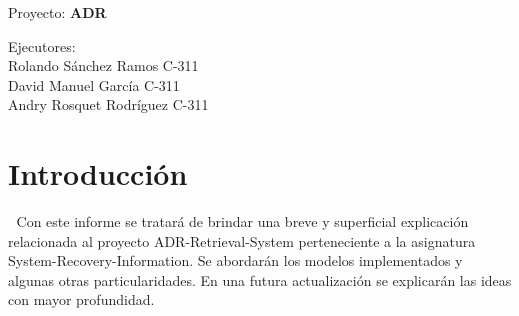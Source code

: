 \documentclass[10pt]{amsart}
\title{}
\author{}
\date{\today}
\begin{document}
	\begin{titlepage}
		\clearpage
		\maketitle
		
		\vspace{3em}
		\begin{center}
			Proyecto: \textbf{ADR} 	
		
		\vspace{12em}
		Ejecutores: \\
		Rolando Sánchez Ramos C-311\\
		David Manuel García C-311\\
		Andry Rosquet Rodríguez C-311
		\end{center}
		\thispagestyle{empty}
	    \vspace{0.7em}
		\section{Introducción} \textcolor{white}{.}
		Con este informe se tratará de brindar una breve y superficial explicación relacionada al proyecto ADR-Retrieval-System perteneciente a la asignatura System-Recovery-Information. Se abordarán los modelos implementados y algunas otras particularidades. En una futura actualización se explicarán las ideas con mayor profundidad.
		   

\end{titlepage}
\end{document}
